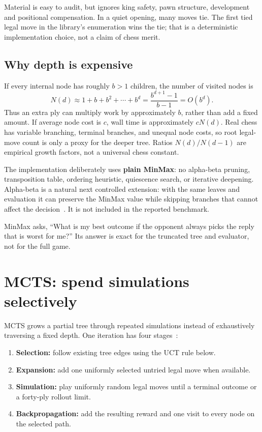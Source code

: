\documentclass[10pt,letterpaper]{article}
\newcommand{\talk}[1]{\par\smallskip\noindent{\color{teal}\textbf{Meeting takeaway.}} #1\par}
\begin{document}
Material is easy to audit, but ignores king safety, pawn structure, development and positional compensation. In a quiet opening, many moves tie. The first tied legal move in the library's enumeration wins the tie; that is a deterministic implementation choice, not a claim of chess merit.

\subsection{Why depth is expensive}
If every internal node has roughly $b>1$ children, the number of visited nodes is
\[
N(d)\approx 1+b+b^2+\cdots+b^d=\frac{b^{d+1}-1}{b-1}=O(b^d).
\]
Thus an extra ply can multiply work by approximately $b$, rather than add a fixed amount. If average node cost is $c$, wall time is approximately $cN(d)$. Real chess has variable branching, terminal branches, and unequal node costs, so root legal-move count is only a proxy for the deeper tree. Ratios $N(d)/N(d-1)$ are empirical growth factors, not a universal chess constant.

The implementation deliberately uses \textbf{plain MinMax}: no alpha-beta pruning, transposition table, ordering heuristic, quiescence search, or iterative deepening. Alpha-beta is a natural next controlled extension: with the same leaves and evaluation it can preserve the MinMax value while skipping branches that cannot affect the decision~\cite{aima2021}. It is not included in the reported benchmark.

\talk{MinMax asks, ``What is my best outcome if the opponent always picks the reply that is worst for me?'' Its answer is exact for the truncated tree and evaluator, not for the full game.}

\newpage
\section{MCTS: spend simulations selectively}
MCTS grows a partial tree through repeated simulations instead of exhaustively traversing a fixed depth. One iteration has four stages~\cite{browne2012}:
\begin{enumerate}
\item \textbf{Selection:} follow existing tree edges using the UCT rule below.
\item \textbf{Expansion:} add one uniformly selected untried legal move when available.
\item \textbf{Simulation:} play uniformly random legal moves until a terminal outcome or a forty-ply rollout limit.
\item \textbf{Backpropagation:} add the resulting reward and one visit to every node on the selected path.
\end{enumerate}
\end{document}
